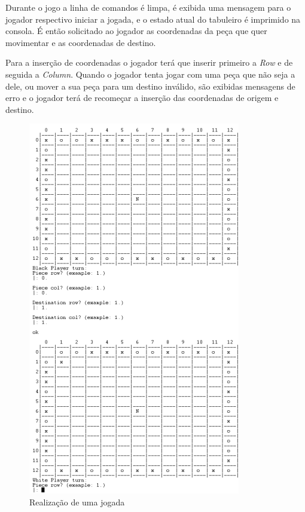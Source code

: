 \documentclass[a4paper]{article}
\begin{document}
\newpage
\par Durante o jogo a linha de comandos é limpa, é exibida uma mensagem para o jogador respectivo iniciar a jogada, e o estado atual do tabuleiro é imprimido na consola. É então solicitado ao jogador as coordenadas da peça que quer movimentar e as coordenadas de destino. 
\par Para a inserção de coordenadas o jogador terá que inserir primeiro a \textit{Row} e de seguida a \textit{Column}. Quando o jogador tenta jogar com uma peça que não seja a dele, ou mover a sua peça para um destino inválido, são exibidas mensagens de erro e o jogador terá de recomeçar a inserção das coordenadas de origem e destino. 

\begin{figure}[h!]
\begin{center}
\hspace*{-0.5cm}\includegraphics[scale=1]{game1.png}
\caption{Realização de uma jogada}
\end{center}
\end{figure}
\end{document}

